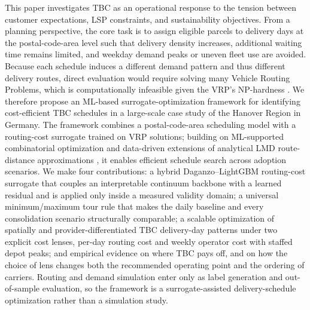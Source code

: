 \documentclass[preprint,12pt,authoryear]{elsarticle}
\begin{document}
This paper investigates TBC as an operational response to the tension between customer expectations, LSP constraints, and sustainability objectives. From a planning perspective, the core task is to assign eligible parcels to delivery days at the postal-code-area level such that delivery density increases, additional waiting time remains limited, and weekday demand peaks or uneven fleet use are avoided. Because each schedule induces a different demand pattern and thus different delivery routes, direct evaluation would require solving many Vehicle Routing Problems, which is computationally infeasible given the VRP's NP-hardness \citep{LenstraRinnooyKan1981}. We therefore propose an ML-based surrogate-optimization framework for identifying cost-efficient TBC schedules in a large-scale case study of the Hanover Region in Germany. The framework combines a postal-code-area scheduling model with a routing-cost surrogate trained on VRP solutions; building on ML-supported combinatorial optimization \citep{BENGIO2021405} and data-driven extensions of analytical LMD route-distance approximations \citep{Figliozzi08, KIRUBAKARAN2026101720}, it enables efficient schedule search across adoption scenarios. We make four contributions: a hybrid Daganzo--LightGBM routing-cost surrogate that couples an interpretable continuum backbone with a learned residual and is applied only inside a measured validity domain; a universal minimum/maximum tour rule that makes the daily baseline and every consolidation scenario structurally comparable; a scalable optimization of spatially and provider-differentiated TBC delivery-day patterns under two explicit cost lenses, per-day routing cost and weekly operator cost with staffed depot peaks; and empirical evidence on where TBC pays off, and on how the choice of lens changes both the recommended operating point and the ordering of carriers. Routing and demand simulation enter only as label generation and out-of-sample evaluation, so the framework is a surrogate-assisted delivery-schedule optimization rather than a simulation study.








\end{document}
